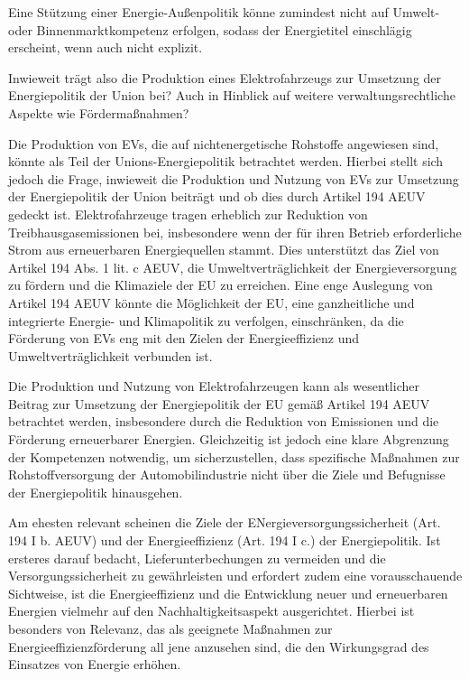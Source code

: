 \documentclass[12pt,a4paper,oneside]{book} %
\begin{document}
Eine Stützung einer Energie-Außenpolitik könne zumindest nicht auf Umwelt- oder Binnenmarktkompetenz erfolgen, sodass der Energietitel einschlägig erscheint, wenn auch nicht explizit.\autocite{Gundel, Theobald/Kühling, Europäisches Energierecht, V. Rn. 87}
	
Inwieweit trägt also die Produktion eines Elektrofahrzeugs zur Umsetzung der Energiepolitik der Union bei? Auch in Hinblick auf weitere verwaltungsrechtliche Aspekte wie Fördermaßnahmen?

Die Produktion von EVs, die auf nichtenergetische Rohstoffe angewiesen sind, könnte als Teil der Unions-Energiepolitik betrachtet werden. Hierbei stellt sich jedoch die Frage, inwieweit die Produktion und Nutzung von EVs zur Umsetzung der Energiepolitik der Union beiträgt und ob dies durch Artikel 194 AEUV gedeckt ist. Elektrofahrzeuge tragen erheblich zur Reduktion von Treibhausgasemissionen bei, insbesondere wenn der für ihren Betrieb erforderliche Strom aus erneuerbaren Energiequellen stammt. Dies unterstützt das Ziel von Artikel 194 Abs. 1 lit. c AEUV, die Umweltverträglichkeit der Energieversorgung zu fördern und die Klimaziele der EU zu erreichen. Eine enge Auslegung von Artikel 194 AEUV könnte die Möglichkeit der EU, eine ganzheitliche und integrierte Energie- und Klimapolitik zu verfolgen, einschränken, da die Förderung von EVs eng mit den Zielen der Energieeffizienz und Umweltverträglichkeit verbunden ist.

Die Produktion und Nutzung von Elektrofahrzeugen kann als wesentlicher Beitrag zur Umsetzung der Energiepolitik der EU gemäß Artikel 194 AEUV betrachtet werden, insbesondere durch die Reduktion von Emissionen und die Förderung erneuerbarer Energien. Gleichzeitig ist jedoch eine klare Abgrenzung der Kompetenzen notwendig, um sicherzustellen, dass spezifische Maßnahmen zur Rohstoffversorgung der Automobilindustrie nicht über die Ziele und Befugnisse der Energiepolitik hinausgehen.
	
Am ehesten relevant scheinen die Ziele der ENergieversorgungssicherheit (Art. 194 I b. AEUV) und der Energieeffizienz (Art. 194 I c.) der Energiepolitik. Ist ersteres darauf bedacht, Lieferunterbechungen zu vermeiden und die Versorgungssicherheit zu gewährleisten\autocite[Nettesheim, Art. 194 Rn 16]{grabitz_recht_2024} und erfordert zudem eine vorausschauende Sichtweise\autocite[631]{umbach_europaische_2005}, ist die Energieeffizienz und die Entwicklung neuer und erneuerbaren Energien vielmehr auf den Nachhaltigkeitsaspekt ausgerichtet.\autocite[Nettesheim, Art. 194 Rn 17]{grabitz_recht_2024} Hierbei ist besonders von Relevanz, das als geeignete Maßnahmen zur Energieeffizienzförderung all jene anzusehen sind, die den Wirkungsgrad des Einsatzes von Energie erhöhen.\autocite[Nettesheim, Art. 194 Rn 16]{grabitz_recht_2024}
	
\end{document}
